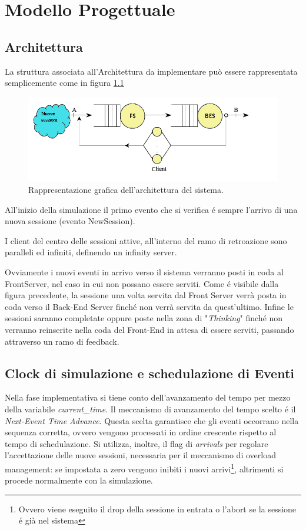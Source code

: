 \chapter{Modello Progettuale}
	\label{cap:modelloprogettuale}

\section{Architettura}
La struttura associata all'Architettura da implementare pu\`o essere 
rappresentata semplicemente come in figura \ref{fig:architettura}
\begin{figure}[H]
	\centering
	\includegraphics[scale=0.7]{img/architettura.png}
	\caption[Architettura del sistema]{Rappresentazione grafica 
dell'architettura del sistema.}
	\label{fig:architettura}
	\end{figure}
All'inizio della simulazione il primo evento che si verifica \'e sempre l'arrivo 
di una nuova sessione (evento NewSession).

\vspace{0.5cm}I client del centro delle sessioni attive, all'interno del ramo di 
retroazione sono paralleli ed infiniti, definendo un infinity server.

\vspace{0.5cm}Ovviamente i nuovi eventi in arrivo verso il sistema verranno 
posti in coda al FrontServer, nel caso in cui non possano essere serviti. Come 
\'e visibile dalla figura precedente, la sessione una volta servita dal 
Front Server verr\`a posta in coda verso il Back-End Server finch\'e non verr\`a 
servita da quest'ultimo. Infine le sessioni saranno completate oppure poste 
nella zona di "\textit{Thinking}" finch\'e non verranno reinserite nella coda 
del Front-End in attesa di essere serviti, passando attraverso un ramo di 
feedback.
 
\section{Clock di simulazione e schedulazione di  Eventi}
Nella fase implementativa si tiene conto dell'avanzamento del tempo per mezzo 
della variabile \textit{current\_time}. Il meccanismo di avanzamento del tempo 
scelto \'e il \textit{Next-Event Time Advance}. Questa scelta garantisce che gli 
eventi occorrano nella sequenza corretta, ovvero vengono processati in ordine 
crescente rispetto al tempo di schedulazione. Si utilizza, inoltre, il flag di 
\textit{arrivals} per regolare l'accettazione delle nuove sessioni, necessaria per il meccanismo di overload management: se impostata 
a zero vengono inibiti i nuovi arrivi\footnote{Ovvero viene eseguito il drop 
della sessione in entrata o l'abort se la sessione \'e gi\`a nel sistema}, 
altrimenti si procede normalmente con la simulazione.

